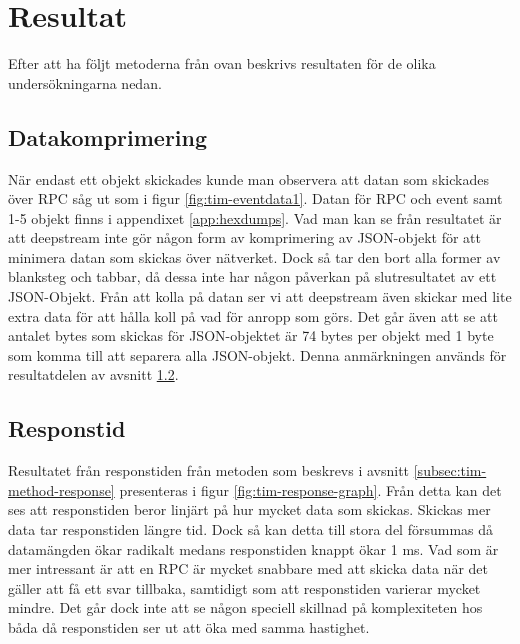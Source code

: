 \section{Resultat}
\label{sec:tim-results}
Efter att ha följt metoderna från ovan beskrivs resultaten för de olika undersökningarna nedan. 

\subsection{Datakomprimering}
När endast ett objekt skickades kunde man observera att datan som skickades över RPC såg ut som i figur \ref{fig:tim-eventdata1}. Datan för RPC och event samt 1-5 objekt finns i appendixet \ref{app:hexdumps}. Vad man kan se från resultatet är att deepstream inte gör någon form av komprimering av JSON-objekt för att minimera datan som skickas över nätverket. Dock så tar den bort alla former av blanksteg och tabbar, då dessa inte har någon påverkan på slutresultatet av ett JSON-Objekt. Från att kolla på datan ser vi att deepstream även skickar med lite extra data för att hålla koll på vad för anropp som görs. Det går även att se att antalet bytes som skickas för JSON-objektet är 74 bytes per objekt med 1 byte som komma till att separera alla JSON-objekt. Denna anmärkningen används för resultatdelen av avsnitt \ref{subsec:tim-result-response}.

\subsection{Responstid}
\label{subsec:tim-result-response}
Resultatet från responstiden från metoden som beskrevs i avsnitt \ref{subsec:tim-method-response} presenteras i figur \ref{fig:tim-response-graph}. Från detta kan det ses att responstiden beror linjärt på hur mycket data som skickas. Skickas mer data tar responstiden längre tid. Dock så kan detta till stora del försummas då datamängden ökar radikalt medans responstiden knappt ökar 1 ms. Vad som är mer intressant är att en RPC är mycket snabbare med att skicka data när det gäller att få ett svar tillbaka, samtidigt som att responstiden varierar mycket mindre. Det går dock inte att se någon speciell skillnad på komplexiteten hos båda då responstiden ser ut att öka med samma hastighet.

